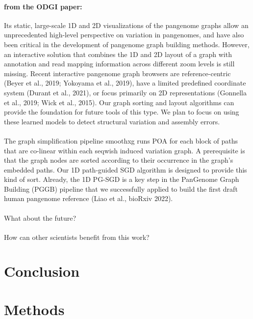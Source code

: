 \documentclass[11pt,hidelinks]{article}
\begin{document}
\paragraph{from the ODGI paper:}
Its static, large-scale 1D and 2D visualizations of the pangenome graphs allow an unprecedented high-level perspective on variation in pangenomes, and have also been critical in the development of pangenome graph building methods. However, an interactive solution that combines the 1D and 2D layout of a graph with annotation and read mapping information across different zoom levels is still missing. Recent interactive pangenome graph browsers are reference-centric (Beyer et al., 2019; Yokoyama et al., 2019), have a limited predefined coordinate system (Durant et al., 2021), or focus primarily on 2D representations (Gonnella et al., 2019; Wick et al., 2015). Our graph sorting and layout algorithms can provide the foundation for future tools of this type. We plan to focus on using these learned models to detect structural variation and assembly errors.
\paragraph{}
The graph simplification pipeline smoothxg runs POA for each block of paths that are co-linear within each seqwish induced variation graph. A prerequisite is that the graph nodes are sorted according to their occurrence in the graph's embedded paths. Our 1D path-guided SGD algorithm is designed to provide this kind of sort. Already, the 1D PG-SGD is a key step in the PanGenome Graph Building (PGGB) pipeline that we successfully applied to build the first draft human pangenome reference (Liao et al., bioRxiv 2022).
\paragraph{}
What about the future? 
\paragraph{}
How can other scientists benefit from this work?
\section{Conclusion}

\section{Methods}
\end{document}
